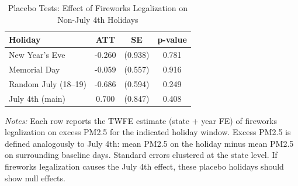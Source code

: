 \begin{table}[H]
\centering
\caption{Placebo Tests: Effect of Fireworks Legalization on Non-July 4th Holidays}
\begin{threeparttable}
\begin{tabular}{lccc}
\toprule
Holiday & ATT & SE & p-value \\
\midrule
New Year's Eve & -0.260 & (0.938) & 0.781 \\
Memorial Day & -0.059 & (0.557) & 0.916 \\
Random July (18--19) & -0.686 & (0.594) & 0.249 \\
July 4th (main) & 0.700 & (0.847) & 0.408 \\
\bottomrule
\end{tabular}
\begin{tablenotes}[flushleft]
\small
\item \textit{Notes:} Each row reports the TWFE estimate (state + year FE) of fireworks legalization on excess PM2.5 for the indicated holiday window. Excess PM2.5 is defined analogously to July 4th: mean PM2.5 on the holiday minus mean PM2.5 on surrounding baseline days. Standard errors clustered at the state level. If fireworks legalization causes the July 4th effect, these placebo holidays should show null effects.
\end{tablenotes}
\end{threeparttable}
\label{tab:placebo}
\end{table}
